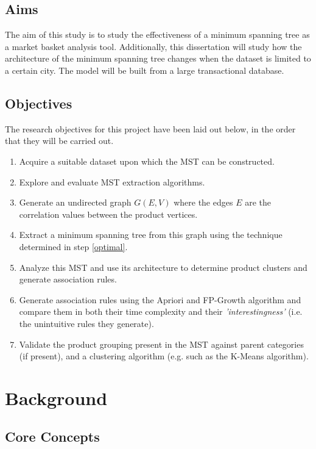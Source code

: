 \documentclass[a4paper,11pt]{article}
\begin{document}
\subsection{Aims}
The aim of this study is to study the effectiveness of a minimum spanning tree as a market basket analysis tool.  Additionally, this dissertation will study how the architecture of the minimum spanning tree changes when the dataset is limited to a certain city. The model will be built from a large transactional database.

\subsection{Objectives}
The research objectives for this project have been laid out below, in the order that they will be carried out.
\begin{enumerate}
\item Acquire a suitable dataset upon which the MST can be constructed.

\item \label{optimal} Explore and evaluate MST extraction algorithms.

\item Generate an undirected graph $G(E,V)$ where the edges $E$ are the correlation values between the product vertices.

\item Extract a minimum spanning tree from this graph using the technique determined in step \ref{optimal}. 

\item Analyze this MST and use its architecture to determine product clusters and generate association rules.

\item Generate association rules using the Apriori and FP-Growth algorithm and compare them in both their time complexity and their \textit{'interestingness'} (i.e. the unintuitive rules they generate).

\item Validate the product grouping present in the MST against parent categories (if present), and a clustering algorithm (e.g.  such as the K-Means algorithm).
\end{enumerate}

\newpage
\section{Background}
\subsection{Core Concepts} %
\end{document}
